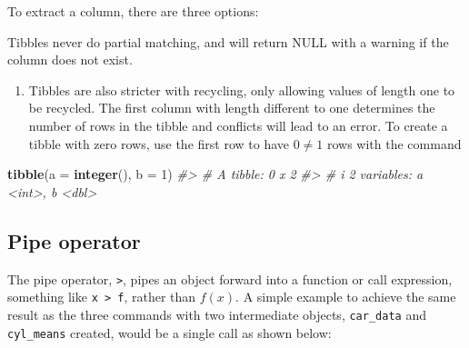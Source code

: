 \documentclass[
]{book}
\newenvironment{Shaded}{\begin{snugshade}}{\end{snugshade}}
\newcommand{\AttributeTok}[1]{\textcolor[rgb]{0.13,0.29,0.53}{#1}}
\newcommand{\CommentTok}[1]{\textcolor[rgb]{0.56,0.35,0.01}{\textit{#1}}}
\newcommand{\DecValTok}[1]{\textcolor[rgb]{0.00,0.00,0.81}{#1}}
\newcommand{\FunctionTok}[1]{\textcolor[rgb]{0.13,0.29,0.53}{\textbf{#1}}}
\newcommand{\NormalTok}[1]{#1}
\newcommand{\SpecialCharTok}[1]{\textcolor[rgb]{0.81,0.36,0.00}{\textbf{#1}}}
\newcommand{\StringTok}[1]{\textcolor[rgb]{0.31,0.60,0.02}{#1}}
\providecommand{\tightlist}{%
  \setlength{\itemsep}{0pt}\setlength{\parskip}{0pt}}
\begin{document}
To extract a column, there are three options:

\begin{Shaded}
\end{Shaded}

Tibbles never do partial matching, and will return NULL with a warning if the column does not exist.

\begin{enumerate}
\def\labelenumi{(\alph{enumi})}
\setcounter{enumi}{2}
\tightlist
\item
  Tibbles are also stricter with recycling, only allowing values of length one to be recycled. The first column with length different to one determines the number of rows in the tibble and conflicts will lead to an error. To create a tibble with zero rows, use the first row to have \(0 \neq 1\) rows with the command
\end{enumerate}

\begin{Shaded}
\begin{Highlighting}[]
\FunctionTok{tibble}\NormalTok{(}\AttributeTok{a =} \FunctionTok{integer}\NormalTok{(), }\AttributeTok{b =} \DecValTok{1}\NormalTok{)}
\CommentTok{\#\textgreater{} \# A tibble: 0 x 2}
\CommentTok{\#\textgreater{} \# i 2 variables: a \textless{}int\textgreater{}, b \textless{}dbl\textgreater{}}
\end{Highlighting}
\end{Shaded}

\subsection{Pipe operator}\label{pipe-operator}

The pipe operator, \texttt{\textbar{}\textgreater{}}, pipes an object forward into a function or call expression, something like \texttt{x\ \textbar{}\textgreater{}\ f}, rather than \(f(x)\). A simple example to achieve the same result as the three commands with two intermediate objects, \texttt{car\_data} and \texttt{cyl\_means} created, would be a single call as shown below:
\end{document}
